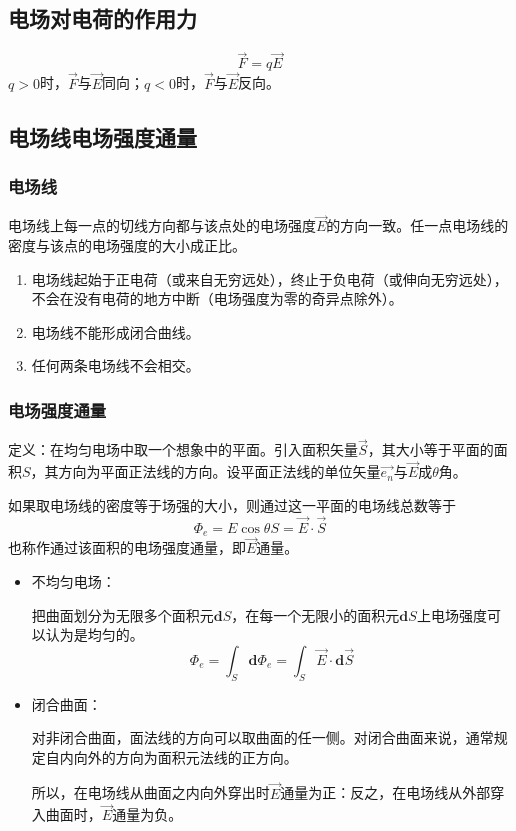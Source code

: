 \subsection{电场对电荷的作用力}
$$\vec{F}=q\vec{E}$$
$q>0$时，$\vec{F}$与$\vec{E}$同向；$q<0$时，$\vec{F}$与$\vec{E}$反向。

\subsection{电场线\quad 电场强度通量}
\subsubsection{电场线}
 电场线上每一点的切线方向都与该点处的电场强度$\vec{E}$的方向一致。任一点电场线的密度与该点的电场强度的大小成正比。
 
 \begin{enumerate}
 	\item 电场线起始于正电荷（或来自无穷远处），终止于负电荷（或伸向无穷远处），不会在没有电荷的地方中断（电场强度为零的奇异点除外）。
 	\item 电场线不能形成闭合曲线。
 	\item 任何两条电场线不会相交。
 \end{enumerate}
 
 \subsubsection{电场强度通量}
 定义：在均匀电场中取一个想象中的平面。引入面积矢量$\vec{S}$，其大小等于平面的面积$S$，其方向为平面正法线的方向。设平面正法线的单位矢量$\vec{e_n}$与$\vec{E}$成$\theta$角。
 
 如果取电场线的密度等于场强的大小，则通过这一平面的电场线总数等于
 $$\varPhi_e=E\cos\theta S=\vec{E}\cdot\vec{S}$$
 也称作通过该面积的电场强度通量，即$\vec{E}$通量。
 
 \begin{itemize}
 	\item 不均匀电场：
 	
 	把曲面划分为无限多个面积元$\mathbf{d}S$，在每一个无限小的面积元$\mathbf{d}S$上电场强度可以认为是均匀的。
 	$$\varPhi_e=\int_{S}\mathbf{d}\varPhi_e=\int_{S}\vec{E}\cdot\mathbf{d}\vec{S}$$
 	
 	\item 闭合曲面：
 	
 	对非闭合曲面，面法线的方向可以取曲面的任一侧。对闭合曲面来说，通常规定自内向外的方向为面积元法线的正方向。
 	
 	所以，在电场线从曲面之内向外穿出时$\vec{E}$通量为正：反之，在电场线从外部穿入曲面时，$\vec{E}$通量为负。
 \end{itemize}